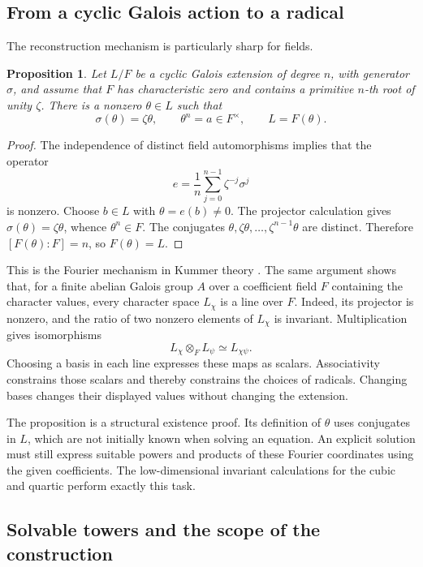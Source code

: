\documentclass[11pt]{article}
\newtheorem{proposition}{Proposition}[section]
\theoremstyle{remark}
\begin{document}
\subsection{From a cyclic Galois action to a radical}

The reconstruction mechanism is particularly sharp for fields.

\begin{proposition}
\label{fourier:kummer}
Let \(L/F\) be a cyclic Galois extension of degree \(n\), with generator \(\sigma\), and assume that \(F\) has characteristic zero and contains a primitive \(n\)-th root of unity \(\zeta\). There is a nonzero \(\theta\in L\) such that
\[
\sigma(\theta)=\zeta\theta,
\qquad
\theta^n=a\in F^\times,
\qquad
L=F(\theta).
\]
\end{proposition}

\begin{proof}
The independence of distinct field automorphisms implies that the operator
\[
e=\frac1n\sum_{j=0}^{n-1}\zeta^{-j}\sigma^j
\]
is nonzero. Choose \(b\in L\) with \(\theta=e(b)\ne0\). The projector calculation gives \(\sigma(\theta)=\zeta\theta\), whence \(\theta^n\in F\). The conjugates \(\theta,\zeta\theta,\ldots,\zeta^{n-1}\theta\) are distinct. Therefore \([F(\theta):F]=n\), so \(F(\theta)=L\).
\end{proof}

This is the Fourier mechanism in Kummer theory \cite{milne,stacks-kummer}. The same argument shows that, for a finite abelian Galois group \(A\) over a coefficient field \(F\) containing the character values, every character space \(L_\chi\) is a line over \(F\). Indeed, its projector is nonzero, and the ratio of two nonzero elements of \(L_\chi\) is invariant. Multiplication gives isomorphisms
\[
L_\chi\otimes_F L_\psi\simeq L_{\chi\psi}.
\]
Choosing a basis in each line expresses these maps as scalars. Associativity constrains those scalars and thereby constrains the choices of radicals. Changing bases changes their displayed values without changing the extension.

The proposition is a structural existence proof. Its definition of \(\theta\) uses conjugates in \(L\), which are not initially known when solving an equation. An explicit solution must still express suitable powers and products of these Fourier coordinates using the given coefficients. The low-dimensional invariant calculations for the cubic and quartic perform exactly this task.

\subsection{Solvable towers and the scope of the construction}
\end{document}
